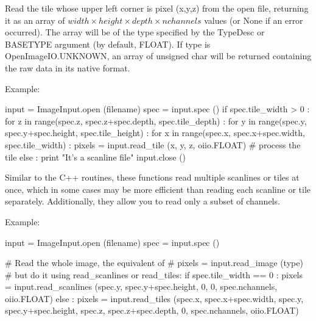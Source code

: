 Read the tile whose upper left corner is pixel {\cf (x,y,z)} from the open
file, returning it as an array of
$\mathit{width} \times \mathit{height} \times \mathit{depth} \times \mathit{nchannels}$
values (or {\cf None} if an error occurred). The array will be of the type
specified by the {\cf TypeDesc} or {\cf BASETYPE} argument (by default,
{\cf FLOAT}). If {\cf type} is {\cf OpenImageIO.UNKNOWN}, an
array of {\cf unsigned char} will be returned containing the raw data in
its native format.

\noindent Example:
\begin{code}
    input = ImageInput.open (filename)
    spec = input.spec ()
    if spec.tile_width > 0 :
        for z in range(spec.z, spec.z+spec.depth, spec.tile_depth) :
            for y in range(spec.y, spec.y+spec.height, spec.tile_height) :
                for x in range(spec.x, spec.x+spec.width, spec.tile_width) :
                    pixels = input.read_tile (x, y, z, oiio.FLOAT)
                    # process the tile
    else :
        print "It's a scanline file"
    input.close ()
\end{code}
\apiend

Similar to the C++ routines, these functions read multiple scanlines or 
tiles at once, which in some cases may be more efficient than reading
each scanline or tile separately.  Additionally, they allow you to read only
a subset of channels.

\noindent Example:
\begin{code}
    input = ImageInput.open (filename)
    spec = input.spec ()

    # Read the whole image, the equivalent of
    #     pixels = input.read_image (type)
    # but do it using read_scanlines or read_tiles:
    if spec.tile_width == 0 :
        pixels = input.read_scanlines (spec.y, spec.y+spec.height, 0,
                                       0, spec.nchannels, oiio.FLOAT)
    else :
        pixels = input.read_tiles (spec.x, spec.x+spec.width,
                                   spec.y, spec.y+spec.height,
                                   spec.z, spec.z+spec.depth,
                                   0, spec.nchannels, oiio.FLOAT)
\end{code}
\apiend

